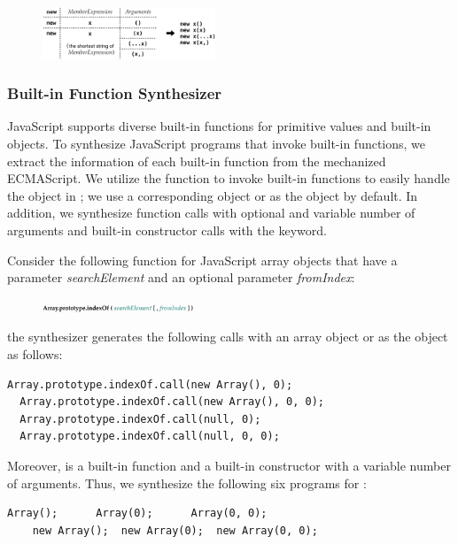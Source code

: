 \vspace*{-.5em}
\begin{figure}[H]
  \centering
  \includegraphics[width=0.46\textwidth]{img/member-example}
\end{figure}
\vspace*{-.5em}

\subsubsection{Built-in Function Synthesizer}

JavaScript supports diverse built-in functions for primitive values and built-in objects.
To synthesize JavaScript programs that invoke built-in functions,
we extract the information of each built-in function from the mechanized ECMAScript.
We utilize the  function to invoke
built-in functions to easily handle the  object in ;
we use a corresponding object or  as the  object by default.
In addition, we synthesize function calls with optional and variable number of arguments
and built-in constructor calls with the  keyword.

Consider the following  function for
JavaScript array objects that have a parameter \textit{searchElement}
and an optional parameter \textit{fromIndex}:

\vspace*{-.5em}
\begin{figure}[H]
  \centering
  \includegraphics[width=0.4\textwidth]{img/array-indexof}
\end{figure}
\vspace*{-.5em}

\noindent
the synthesizer generates the following calls with an array object or  as the 
object as follows:
\begin{lstlisting}[style=myJSstyle]
  Array.prototype.indexOf.call(new Array(), 0);
  Array.prototype.indexOf.call(new Array(), 0, 0);
  Array.prototype.indexOf.call(null, 0);
  Array.prototype.indexOf.call(null, 0, 0);
\end{lstlisting}
Moreover,  is a built-in function and
a built-in constructor with a variable number of arguments.
Thus, we synthesize the following six programs for :
\begin{lstlisting}[style=myJSstyle]
    Array();      Array(0);      Array(0, 0);
    new Array();  new Array(0);  new Array(0, 0);
\end{lstlisting}
